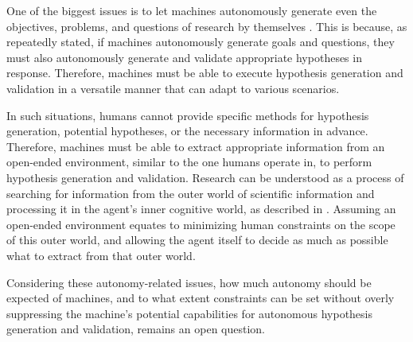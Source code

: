 One of the biggest issues is to let machines autonomously generate even the objectives, problems, and questions of research by themselves \cite{coley2020autonomousII}. This is because, as repeatedly stated, if machines autonomously generate goals and questions, they must also autonomously generate and validate appropriate hypotheses in response. Therefore, machines must be able to execute hypothesis generation and validation in a versatile manner that can adapt to various scenarios.

In such situations, humans cannot provide specific methods for hypothesis generation, potential hypotheses, or the necessary information in advance. Therefore, machines must be able to extract appropriate information from an open-ended environment, similar to the one humans operate in, to perform hypothesis generation and validation. Research can be understood as a process of searching for information from the outer world of scientific information and processing it in the agent's inner cognitive world, as described in \cite{hope2022computational}. Assuming an open-ended environment equates to minimizing human constraints on the scope of this outer world, and allowing the agent itself to decide as much as possible what to extract from that outer world.

Considering these autonomy-related issues, how much autonomy should be expected of machines, and to what extent constraints can be set without overly suppressing the machine's potential capabilities for autonomous hypothesis generation and validation, remains an open question.



